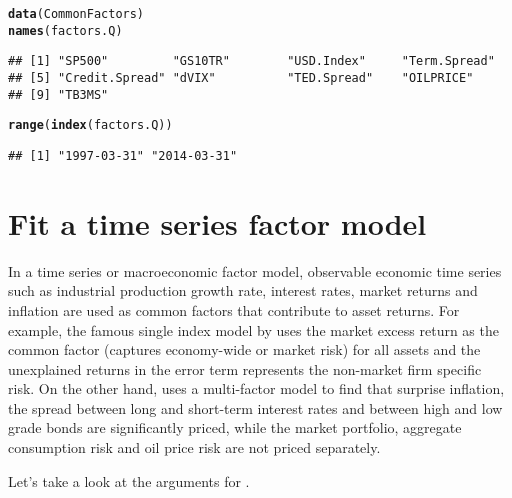 \documentclass[a4paper]{article}\usepackage[]{graphicx}\usepackage[]{color}
\makeatletter
\newcommand{\hlstd}[1]{\textcolor[rgb]{0.345,0.345,0.345}{#1}}%
\newcommand{\hlkwd}[1]{\textcolor[rgb]{0.737,0.353,0.396}{\textbf{#1}}}%
\newenvironment{kframe}{%
 \def\at@end@of@kframe{}%
 \ifinner\ifhmode%
  \def\at@end@of@kframe{\end{minipage}}%
  \begin{minipage}{\columnwidth}%
 \fi\fi%
 \def\FrameCommand##1{\hskip\@totalleftmargin \hskip-\fboxsep
 \colorbox{shadecolor}{##1}\hskip-\fboxsep
     \hskip-\linewidth \hskip-\@totalleftmargin \hskip\columnwidth}%
 \MakeFramed {\advance\hsize-\width
   \@totalleftmargin\z@ \linewidth\hsize
   \@setminipage}}%
 {\par\unskip\endMakeFramed%
 \at@end@of@kframe}
\newenvironment{knitrout}{}{} %
\makeatother
\begin{document}
\begin{knitrout}
\color{fgcolor}\begin{kframe}
\begin{alltt}
\hlkwd{data}\hlstd{(CommonFactors)}
\hlkwd{names}\hlstd{(factors.Q)}
\end{alltt}
\begin{verbatim}
## [1] "SP500"         "GS10TR"        "USD.Index"     "Term.Spread"  
## [5] "Credit.Spread" "dVIX"          "TED.Spread"    "OILPRICE"     
## [9] "TB3MS"
\end{verbatim}
\begin{alltt}
\hlkwd{range}\hlstd{(}\hlkwd{index}\hlstd{(factors.Q))}
\end{alltt}
\begin{verbatim}
## [1] "1997-03-31" "2014-03-31"
\end{verbatim}
\end{kframe}
\end{knitrout}

\newpage
\section{Fit a time series factor model}

In a time series or macroeconomic factor model, observable economic time series such as industrial production growth rate, interest rates, market returns and inflation are used as common factors that contribute to asset returns. For example, the famous single index model by \citet{sharpe1964capital} uses the market excess return as the common factor (captures economy-wide or market risk) for all assets and the unexplained returns in the error term represents the non-market firm specific risk. On the other hand, \citet{chen1986economic} uses a multi-factor model to find that surprise inflation, the spread between long and short-term interest rates and between high and low grade bonds are significantly priced, while the market portfolio, aggregate consumption risk and oil price risk are not priced separately. 

Let's take a look at the arguments for .
\end{document}
